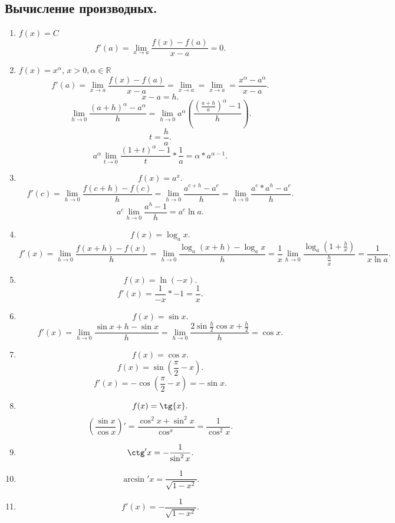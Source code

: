 \documentclass[a4paper]{scrartcl}
\begin{document}
\subsection{Вычисление производных.}
\begin{enumerate}
	\item $f(x) = C $
	      \[
		      f'(a) = \lim_{x \to a} \frac{f(x) - f(a)}{x - a} = 0
		      .\]
	\item
	      $f(x) = x^\alpha$,  $x > 0, \alpha \in \mathbb{R}$
	      \[
		      f'(a) = \lim_{x \to a} \frac{f(x) - f(a)}{x -a} = \lim_{x \to a} =
		      \lim_{x \to a} = \frac{x^\alpha - a^\alpha}{x - a}
		      .\]
	      \[
		      x - a = h
		      .\]
	      \[
		      \lim_{h \to 0} \frac{(a + h)^\alpha - a^\alpha}{h} = \lim_{h \to 0} a^{\alpha} (\frac{(\frac{a + h}{a})^{\alpha} - 1}{h})
		      .\]
	      \[
		      t = \frac{h}{a}
		      .\]
	      \[
		      a^{\alpha} \lim_{t \to 0} \frac{(1 + t)^\alpha - 1}{t} * \frac{1}{a} = \alpha*a^{\alpha - 1}
		      .\]
	\item
	      \[
		      f(x) = a^x
		      .\]
	      \[
		      f'(c) = \lim_{h \to 0} \frac{f(c + h) - f(c)}{h} = \lim_{h \to 0} \frac{a^{c + h} - a^c}{h} = \lim_{h \to 0} \frac{a^c*a^h - a^c}{h}
		      .\]
	      \[
		      a^c \lim_{h \to 0} \frac{a^h - 1}{h} = a^c \ln{a}
		      .\]
	\item
	      \[
		      f(x) = \log_a{x}
		      .\]
	      \[
		      f'(x) = \lim_{h \to 0} \frac{f(x + h) - f(x)}{h} = \lim_{h \to 0} \frac{\log_a(x+h) - \log_a{x}}{h} = \frac{1}{x} \lim_{h \to 0} \frac{\log_a{( 1 + \frac{h}{x} )}}{\frac{h}{x}} = \frac{1}{x\ln{a}}
		      .\]
	\item
	      \[
		      f(x) = \ln(-x)
		      .\]
	      \[
		      f'(x) = \frac{1}{-x}*-1 = \frac{1}{x}
		      .\]
	\item
	      \[
		      f(x) = \sin{x}
		      .\]
	      \[
		      f'(x) = \lim_{h \to 0} \frac{\sin{x + h} - \sin{x}}{h} =
		      \lim_{h \to 0} \frac{2\sin{\frac{h}{2}}\cos{x + \frac{h}{2}}}{h} = \cos{x}
		      .\]
	\item
	      \[
		      f(x) = \cos{x}
		      .\]
	      \[
		      f(x) = \sin{( \frac{\pi}{2} - x )}
		      .\]
	      \[
		      f'(x) =-\cos{(\frac{ \pi}{2} - x )} = -\sin{x}
		      .\]
	\item
	      \[
		      f(x) = \tg{x}
		      .\]
	      \[
		      (\frac{\sin{x}}{\cos{x}})' = \frac{\cos^2{x} + \sin^2{x}}{\cos^{x}} = \frac{1}{\cos^2{x}}
		      .\]
	\item
	      \[
		      \ctg'{x} = -\frac{1}{\sin^2{x}}
		      .\]
              \item
                  \[
                      \arcsin'{x} = \frac{1}{\sqrt{1 - x^2} }
                  .\] 
            \item
                \[
                f'(x) = - \frac{1}{\sqrt{1 - x^2} }
                .\] 
\end{enumerate}
\end{document}
